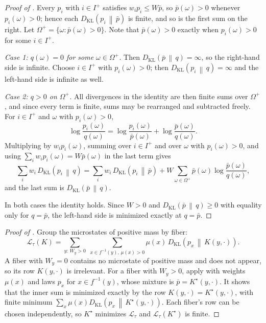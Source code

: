 \documentclass[11pt]{article}
\theoremstyle{definition}
\newcommand{\1}{\mathbf{1}}
\newcommand{\DKL}[2]{D_{\mathrm{KL}}\!\left(#1\,\middle\|\,#2\right)}
\begin{document}
\begin{proof}[Proof of ]
Every $p_i$ with $i\in I^+$ satisfies $w_ip_i\le W\bar p$, so $\bar p(\omega)>0$ whenever $p_i(\omega)>0$; hence each $\DKL{p_i}{\bar p}$ is finite, and so is the first sum on the right.
Let $\Omega^+=\{\omega:\bar p(\omega)>0\}$.
Note that $\bar p(\omega)>0$ exactly when $p_i(\omega)>0$ for some $i\in I^+$.

\emph{Case 1: $q(\omega)=0$ for some $\omega\in\Omega^+$.}
Then $\DKL{\bar p}{q}=\infty$, so the right-hand side is infinite.
Choose $i\in I^+$ with $p_i(\omega)>0$; then $\DKL{p_i}{q}=\infty$ and the left-hand side is infinite as well.

\emph{Case 2: $q>0$ on $\Omega^+$.}
All divergences in the identity are then finite sums over $\Omega^+$, and since every term is finite, sums may be rearranged and subtracted freely.
For $i\in I^+$ and $\omega$ with $p_i(\omega)>0$,
\[
  \log\frac{p_i(\omega)}{q(\omega)}=\log\frac{p_i(\omega)}{\bar p(\omega)}+\log\frac{\bar p(\omega)}{q(\omega)}.
\]
Multiplying by $w_ip_i(\omega)$, summing over $i\in I^+$ and over $\omega$ with $p_i(\omega)>0$, and using $\sum_iw_ip_i(\omega)=W\bar p(\omega)$ in the last term gives
\[
  \sum_i w_i\,\DKL{p_i}{q}=\sum_i w_i\,\DKL{p_i}{\bar p}+W\sum_{\omega\in\Omega^+}\bar p(\omega)\log\frac{\bar p(\omega)}{q(\omega)},
\]
and the last sum is $\DKL{\bar p}{q}$.

In both cases the identity holds.
Since $W>0$ and $\DKL{\bar p}{q}\ge 0$ with equality only for $q=\bar p$, the left-hand side is minimized exactly at $q=\bar p$.
\end{proof}

\begin{proof}[Proof of ]
Group the microstates of positive mass by fiber:
\[
  \mathcal{L}_\tau(K)=\sum_{y:\,W_y>0}\;\sum_{x\in f^{-1}(y),\,\mu(x)>0}\mu(x)\,\DKL{p_x}{K(y,\cdot)}.
\]
A fiber with $W_y=0$ contains no microstate of positive mass and does not appear, so its row $K(y,\cdot)$ is irrelevant.
For a fiber with $W_y>0$, apply  with weights $\mu(x)$ and laws $p_x$ for $x\in f^{-1}(y)$, whose mixture is $\bar p=K^\star(y,\cdot)$.
It shows that the inner sum is minimized exactly by the row $K(y,\cdot)=K^\star(y,\cdot)$, with finite minimum $\sum_x\mu(x)\DKL{p_x}{K^\star(y,\cdot)}$.
Each fiber's row can be chosen independently, so $K^\star$ minimizes $\mathcal{L}_\tau$ and $\mathcal{L}_\tau(K^\star)$ is finite.
\end{proof}
\end{document}
